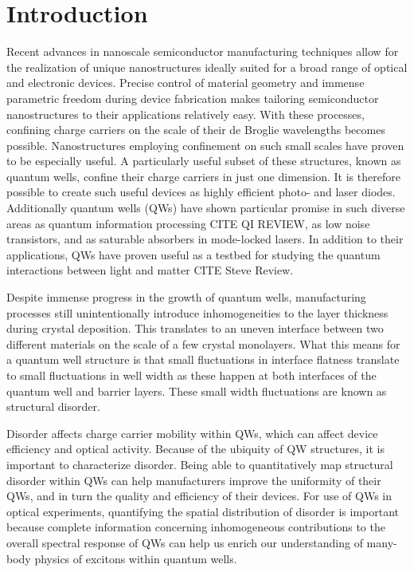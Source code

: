 \chapter{Introduction}



\indent Recent advances in nanoscale semiconductor manufacturing techniques allow for the realization of unique nanostructures ideally suited for a broad range of optical and electronic devices. Precise control of material geometry and immense parametric freedom during device fabrication makes tailoring semiconductor nanostructures to their applications relatively easy. With these processes, confining charge carriers on the scale of their de Broglie wavelengths becomes possible. Nanostructures employing confinement on such small scales have proven to be especially useful. A particularly useful subset of these structures, known as quantum wells, confine their charge carriers in just one dimension. It is therefore possible to create such useful devices as highly efficient photo- and laser diodes. Additionally quantum wells (QWs) have shown particular promise in such diverse areas as quantum information processing  CITE QI REVIEW, as low noise transistors, and as saturable absorbers in mode-locked lasers. In addition to their applications, QWs have proven useful as a testbed for studying the quantum interactions between light and matter CITE Steve Review.

\indent Despite immense progress in the growth of quantum wells, manufacturing processes still unintentionally introduce inhomogeneities to the layer thickness during crystal deposition. This translates to an uneven interface between two different materials on the scale of a few crystal monolayers. What this means for a quantum well structure is that small fluctuations in interface flatness translate to small fluctuations in well width as these happen at both interfaces of the quantum well and barrier layers. These small width fluctuations are known as structural disorder.

\indent Disorder affects charge carrier mobility within QWs, which can affect device efficiency and optical activity. Because of the ubiquity of QW structures, it is important to characterize disorder. Being able to quantitatively map structural disorder within QWs can help manufacturers improve the uniformity of their QWs, and in turn the quality and efficiency of their devices. For use of QWs in optical experiments, quantifying the spatial distribution of disorder is important because complete information concerning inhomogeneous contributions to the overall spectral response of QWs can help us enrich our understanding of many-body physics of excitons within quantum wells.

